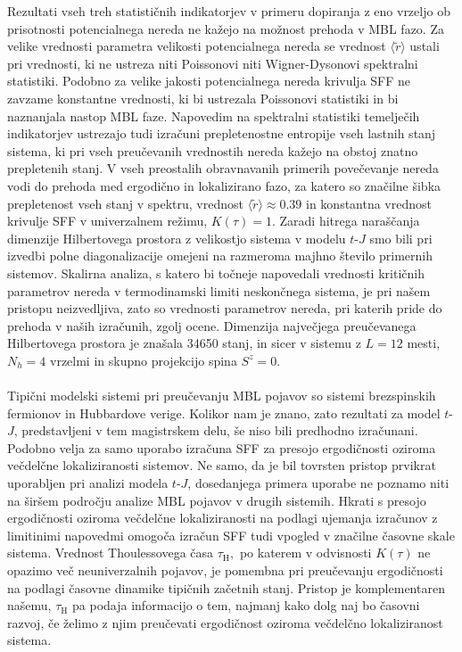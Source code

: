  Rezultati vseh treh statističnih indikatorjev v primeru dopiranja z eno vrzeljo ob prisotnosti potencialnega nereda ne kažejo na možnost prehoda v MBL fazo. Za velike vrednosti parametra velikosti potencialnega nereda se vrednost $\langle \tilde{r}\rangle$ ustali pri vrednosti, ki ne ustreza niti Poissonovi niti Wigner-Dysonovi spektralni statistiki. Podobno za velike jakosti potencialnega nereda krivulja SFF ne zavzame konstantne vrednosti, ki bi ustrezala Poissonovi statistiki in bi naznanjala nastop MBL faze. Napovedim na spektralni statistiki temelječih indikatorjev ustrezajo tudi izračuni prepletenostne entropije vseh lastnih stanj sistema, ki pri vseh preučevanih vrednostih nereda kažejo na obstoj znatno prepletenih stanj. V vseh preostalih obravnavanih primerih povečevanje nereda vodi do prehoda med ergodično in lokalizirano fazo, za katero so značilne šibka prepletenost vseh stanj v spektru, vrednost $\langle \tilde{r}\rangle \approx 0.39$ in konstantna vrednost krivulje SFF v univerzalnem režimu, $K(\tau)=1.$ Zaradi hitrega naraščanja dimenzije Hilbertovega prostora z velikostjo sistema v modelu $t$-$J$ smo bili pri izvedbi polne diagonalizacije omejeni na razmeroma majhno število primernih sistemov. Skalirna analiza, s katero bi točneje napovedali vrednosti kritičnih parametrov nereda v termodinamski limiti neskončnega sistema, je pri našem pristopu neizvedljiva, zato so vrednosti parametrov nereda, pri katerih pride do prehoda v naših izračunih, zgolj ocene. Dimenzija največjega preučevanega Hilbertovega prostora je znašala 34650 stanj, in sicer v sistemu z $L=12$ mesti, $N_h=4$ vrzelmi in skupno projekcijo spina $S^z=0.$\\\\
 Tipični modelski sistemi pri preučevanju MBL pojavov so sistemi brezspinskih fermionov in Hubbardove verige. Kolikor nam je znano, zato rezultati za model $t$-$J$, predstavljeni v tem magistrskem delu, še niso bili predhodno izračunani. Podobno velja za samo uporabo izračuna SFF za presojo ergodičnosti oziroma večdelčne lokaliziranosti sistemov. Ne samo, da je bil tovrsten pristop prvikrat uporabljen pri analizi modela $t$-$J$, dosedanjega primera uporabe ne poznamo niti na širšem področju analize MBL pojavov v drugih sistemih. Hkrati s presojo ergodičnosti oziroma večdelčne lokaliziranosti na podlagi ujemanja izračunov z limitinimi napovedmi omogoča izračun SFF tudi vpogled v značilne časovne skale sistema. Vrednost Thoulessovega časa $\tau_\mathrm{H},$ po katerem v odvisnosti $K(\tau)$ ne opazimo več neuniverzalnih pojavov, je pomembna pri preučevanju ergodičnosti na podlagi časovne dinamike tipičnih začetnih stanj. Pristop je komplementaren našemu, $\tau_\mathrm{H}$ pa podaja informacijo o tem, najmanj kako dolg naj bo časovni razvoj, če želimo z njim preučevati ergodičnost oziroma večdelčno lokaliziranost sistema. \\\\
